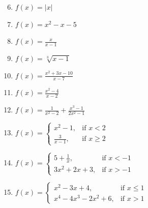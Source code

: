 \documentclass[12pt]{article}
\newif\ifans
\begin{document}
\begin{enumerate}
\setcounter{enumi}{5}

\item $f(x) = |x|$ 

\ifans{\fbox{$f(x)$ is always continuous}}\fi

\item $f(x) = x^2 -x -5$

\ifans{\fbox{$f(x)$ is always continuous}}\fi

\item $f(x) = \frac{x}{x-1}$ 

\ifans{\fbox{$f(x)$ has a discontinuity when $x=1$}}\fi

\item $f(x) = \sqrt[3]{x-1}$ 

\ifans{\fbox{$f(x)$  is always continuous}}\fi

\item $f(x) = \frac{x^2+3x-10}{x-7}$ 

\ifans{\fbox{$f(x)$ has discontinuity when $x=7$}}\fi

\item $f(x) = \frac{x^2-4}{x-2}$ 

\ifans{\fbox{$f(x)$ has a discontinuity when $x=2$}}\fi

\item$f(x) = \frac{1}{x^2-2}+\frac{x^3-1}{2x^2-1}$ 

\ifans{\fbox{$f(x)$ has a discontinuity when $x=\sqrt{2}$, $x=-\sqrt{2}$, $\displaystyle x=\frac{\sqrt{2}}{2}$, and $\displaystyle x=-\frac{\sqrt{2}}{2}$}}\fi

\item $f(x) = \begin{cases} 
x^2-1, & \text{if } x<2 \\
\frac{3}{x-1}, & \text{if } x\geq 2\end{cases}$ 

\ifans{\fbox{$f(x)$ is always continuous}}\fi

\item $f(x) = \begin{cases} 
5+\frac{1}{x}, & \text{if } x<- 1 \\
3x^2+2x+3, & \text{if } x> -1\end{cases} $ 

\ifans{\fbox{$f(x)$ has a discontinuity when $x=-1$}}\fi

\item $f(x) = \begin{cases} 
x^2-3x+4, & \text{if } x\leq1 \\
x^4-4x^3-2x^2+6, & \text{if } x>1 \end{cases}$ 


\end{enumerate}
\end{document}
